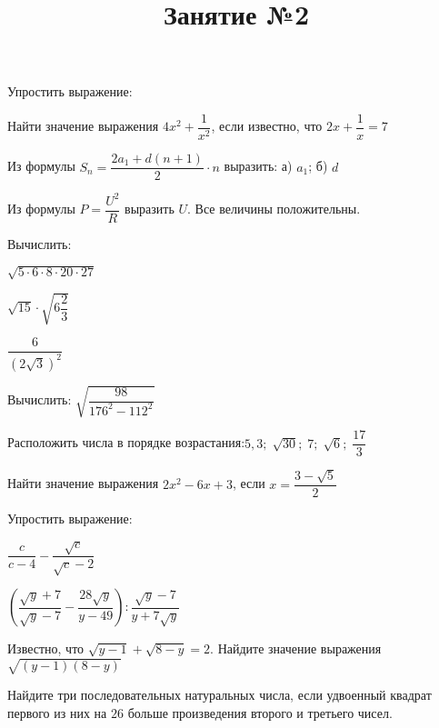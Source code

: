\newpage
\title{Занятие №2}
\begin{listofex}
	\item Упростить выражение:
\begin{enumcols}[itemcolumns=2]
	\item {}
	\item {}
\end{enumcols}

\item Найти значение выражения \( 4x^2+\dfrac{1}{x^2} \), если известно, что \( 2x+\dfrac{1}{x}=7 \)
\item Из формулы \( S_n=\dfrac{2a_1+d(n+1)}{2}\cdot n \) выразить: а) \( a_1 \); б) \( d \)
\item Из формулы \( P=\dfrac{U^2}{R} \) выразить \( U \). Все величины положительны.

\item Вычислить:
\begin{enumcols}[itemcolumns=3]
	\item \( \sqrt{5\cdot6\cdot8\cdot20\cdot27} \)
	\item \( \sqrt{15}\cdot\sqrt{6\dfrac{2}{3}} \)
	\item \( \dfrac{6}{(2\sqrt{3})^2} \)
\end{enumcols}
\item Вычислить: \( \sqrt{\dfrac{98}{176^2-112^2}} \)
\item Расположить числа в порядке возрастания:\quad\( 5,3;\;\sqrt{30};\;7;\;\sqrt{6};\;\dfrac{17}{3} \)
\item Найти значение выражения \( 2x^2-6x+3 \), если \( x=\dfrac{3-\sqrt{5}}{2} \)
\item Упростить выражение:
\begin{enumcols}[itemcolumns=2]
	\item \( \dfrac{c}{c-4}-\dfrac{\sqrt{c}}{\sqrt{c}-2} \)
	\item \( \left( \dfrac{\sqrt{y}+7}{\sqrt{y}-7}-\dfrac{28\sqrt{y}}{y-49} \right):\dfrac{\sqrt{y}-7}{y+7\sqrt{y}} \)
\end{enumcols}
\item Известно, что \( \sqrt{y-1}+\sqrt{8-y}=2 \). Найдите значение выражения \( \sqrt{(y-1)(8-y)} \)
\item Найдите три последовательных натуральных числа, если удвоенный квадрат первого из них на \( 26 \) больше произведения второго и третьего чисел.
\end{listofex}
